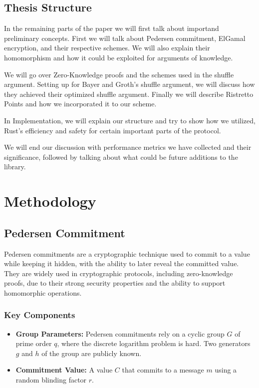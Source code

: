\documentclass[12pt,a4paper]{report}
\begin{document}
\section*{Thesis Structure}
In the remaining parts of the paper we will first talk about importand preliminary concepts. 
First we will talk about Pedersen commitment, ElGamal encryption, and their respective schemes.
We will also explain their homomorphism and how it could be exploited for arguments of knowledge.\par
We will go over Zero-Knowledge proofs and the schemes used in the shuffle argument.
Setting up for Bayer and Groth's shuffle argument, we will discuss how they achieved their optimized shuffle argument.
Finally we will describe Ristretto Points and how we incorporated it to our scheme.\par
In Implementation, we will explain our structure and try to show how we utilized, Rust's efficiency and safety for certain important parts of the protocol.\par
We will end our discussion with performance metrics we have collected and their significance,
followed by talking about what could be future additions to the library.
\chapter{Methodology}

\section{Pedersen Commitment}
Pedersen commitments are a cryptographic technique used to commit to a value 
while keeping it hidden, with the ability to later reveal the committed value. 
They are widely used in cryptographic protocols, including zero-knowledge proofs, 
due to their strong security properties and the ability to support homomorphic operations.
\subsection*{Key Components}
\begin{itemize}
	\item \textbf{Group Parameters:} Pedersen commitments rely on a cyclic group $G$ of prime order $q$, where the discrete logarithm problem is hard. Two generators $g$ and $h$ of the group are publicly known.
	\item \textbf{Commitment Value:} A value $C$ that commits to a message $m$ using a random blinding factor $r$.
\end{itemize}
\end{document}
